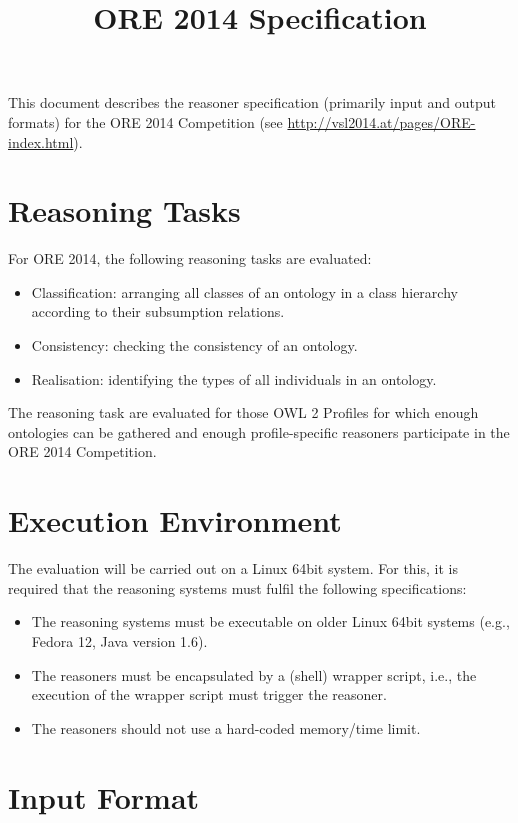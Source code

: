 \documentclass{article}
\title{ORE 2014 Specification}
\begin{document}
\maketitle

This document describes the reasoner specification (primarily input and output formats) for the ORE 2014 Competition (see \url{http://vsl2014.at/pages/ORE-index.html}).


\section{Reasoning Tasks}

For ORE 2014, the following reasoning tasks are evaluated:
\begin{itemize}
\item Classification: arranging all classes of an ontology in a class hierarchy according to their subsumption relations.
\item Consistency: checking the consistency of an ontology.
\item Realisation: identifying the types of all individuals in an ontology.
\end{itemize}
The reasoning task are evaluated for those OWL 2 Profiles for which enough ontologies can be gathered and enough profile-specific reasoners participate in the ORE 2014 Competition.

\section{Execution Environment}

The evaluation will be carried out on a Linux 64bit system. 
For this, it is required that the reasoning systems must fulfil the following specifications:
\begin{itemize}
\item The reasoning systems must be executable on older Linux 64bit systems (e.g., Fedora 12, Java version 1.6).
\item The reasoners must be encapsulated by a (shell) wrapper script, i.e., the execution of the wrapper script must trigger the reasoner.
\item The reasoners should not use a hard-coded memory/time limit.
\end{itemize}


\section{Input Format}
\end{document}
